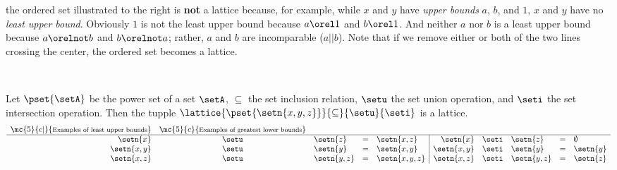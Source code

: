 \begin{minipage}{\tw-40mm}%
\begin{example}
\label{ex:lat_nonlattice_6}
\footnotemark
the ordered set illustrated to the right is {\bf not} a lattice because,
for example,
while $x$ and $y$ have \emph{upper bounds} $a$, $b$, and $1$,
$x$ and $y$ have no \emph{least upper bound}.
Obviously $1$ is not the least upper bound because $a\orel 1$ and $b\orel 1$.
And neither $a$ nor $b$ is a least upper bound because $a\orelnot b$ and $b\orelnot a$;
rather, $a$ and $b$ are incomparable ($a||b$).
Note that if we remove either or both of the two lines crossing the center,
the ordered set becomes a lattice.
\end{example}
\end{minipage}%
%
\hfill{}\hfill\mbox{}\\%

\begin{minipage}{\tw-40mm}%
  \begin{example}
  \label{ex:lat_xyz}
  Let $\pset{\setA}$ be the power set of a set $\setA$,
  $\subseteq$ the set inclusion relation,
  $\setu$ the set union operation,
  and $\seti$ the set intersection operation.
  Then the tupple $\lattice{\pset{\setn{x,y,z}}}{\subseteq}{\setu}{\seti}$
  is a lattice.
  \[\begin{array}{rclcl|rclcl}
    \mc{5}{c|}{\text{\footnotesize Examples of least upper bounds}} &
    \mc{5}{c} {\text{\footnotesize Examples of greatest lower bounds}}
    \\\hline
    \setn{x}   &\setu& \setn{z} &=& \setn{x,z} &
    \setn{x}   &\seti& \setn{z} &=& \emptyset
    \\
    \setn{x,y} &\setu& \setn{y} &=& \setn{x,y} &
    \setn{x,y} &\seti& \setn{y} &=& \setn{y}
    \\
    \setn{x,z} &\setu& \setn{y,z} &=& \setn{x,y,z} &
    \setn{x,z} &\seti& \setn{y,z} &=& \setn{z}
  \end{array}\]
  \end{example}
\end{minipage}%
\hfill{}\hfill\mbox{}\\%


